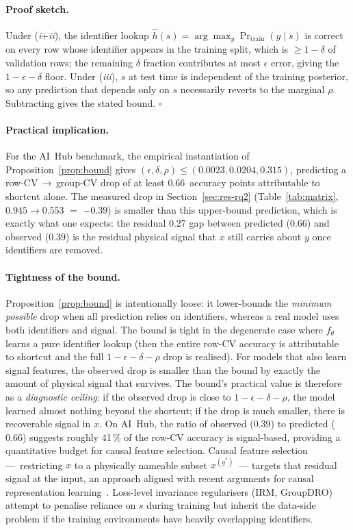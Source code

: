 \documentclass[3p,times,authoryear]{elsarticle}
\theoremstyle{remark}
\begin{document}
\paragraph{Proof sketch.} Under (\emph{i}+\emph{ii}), the
identifier lookup
$\widehat{h}(s) = \arg\max_y \Pr_{\mathrm{train}}(y \mid s)$ is
correct on every row whose identifier appears in the training
split, which is $\geq 1 - \delta$ of validation rows; the
remaining $\delta$ fraction contributes at most $\epsilon$
error, giving the $1 - \epsilon - \delta$ floor. Under
(\emph{iii}), $s$ at test time is independent of the training
posterior, so any prediction that depends only on $s$
necessarily reverts to the marginal $\rho$. Subtracting gives
the stated bound. \hfill$\square$

\paragraph{Practical implication.} For the AI~Hub benchmark, the
empirical instantiation of Proposition~\ref{prop:bound} gives
$(\epsilon, \delta, \rho) \leq (0.0023, 0.0204, 0.315)$, predicting
a row-CV$\,\to\,$group-CV drop of at least $0.66$~accuracy points
attributable to shortcut alone. The measured drop in
Section~\ref{sec:res-rq2} (Table~\ref{tab:matrix}, $0.945 \to 0.553$
$=$ $-0.39$) is smaller than this upper-bound prediction, which is
exactly what one expects: the residual $0.27$ gap between predicted
($0.66$) and observed ($0.39$) is the residual physical signal that
$x$ still carries about $y$ once identifiers are removed.

\paragraph{Tightness of the bound.}
Proposition~\ref{prop:bound} is intentionally loose: it lower-bounds
the \emph{minimum possible} drop when all prediction relies on
identifiers, whereas a real model uses both identifiers and signal.
The bound is tight in the degenerate case where $f_\theta$ learns a
pure identifier lookup (then the entire row-CV accuracy is
attributable to shortcut and the full $1 - \epsilon - \delta - \rho$
drop is realised). For models that also learn signal features, the
observed drop is smaller than the bound by exactly the amount of
physical signal that survives. The bound's practical value is
therefore as a \emph{diagnostic ceiling}: if the observed drop is
close to $1 - \epsilon - \delta - \rho$, the model learned almost
nothing beyond the shortcut; if the drop is much smaller, there is
recoverable signal in $x$. On AI~Hub, the ratio of observed ($0.39$)
to predicted ($0.66$) suggests roughly 41\,\% of the row-CV accuracy
is signal-based, providing a quantitative budget for causal feature
selection. Causal
feature selection ---~restricting $x$ to a physically nameable
subset $x^{(g^{*})}$~--- targets that residual signal at the input,
an approach aligned with recent arguments for causal
representation learning~\cite{scholkopf2021causal}.
Loss-level invariance regularisers (IRM, GroupDRO) attempt to
penalise reliance on $s$ during training but inherit the data-side
problem if the training environments have heavily overlapping
identifiers.
\end{document}
